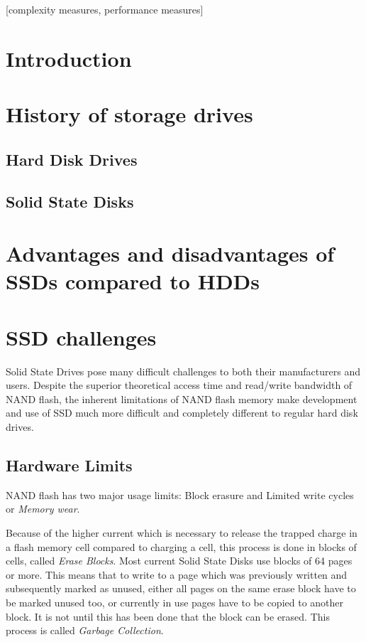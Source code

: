 \documentclass{acm_proc_article-sp}
\begin{document}
[complexity measures, performance measures]

\section{Introduction}

\section{History of storage drives}

\subsection{Hard Disk Drives}

\subsection{Solid State Disks}

\section{Advantages and disadvantages of SSDs compared to HDDs}

\section{SSD challenges}

Solid State Drives pose many difficult challenges to both their manufacturers and users. Despite the superior theoretical access time and read/write bandwidth of NAND flash, the inherent limitations of NAND flash memory make development and use of SSD much more difficult and completely different to regular hard disk drives.

\subsection{Hardware Limits}

NAND flash has two major usage limits: Block erasure and Limited write cycles or \emph{Memory wear}.

Because of the higher current which is necessary to release the trapped charge in a flash memory cell compared to charging a cell, this process is done in blocks of cells, called \emph{Erase Blocks}. Most current Solid State Disks use blocks of 64 pages or more. %
This means that to write to a page which was previously written and subsequently marked as unused, either all pages on the same erase block have to be marked unused too, or currently in use pages have to be copied to another block. It is not until this has been done that the block can be erased. This process is called \emph{Garbage Collection}.
\end{document}
